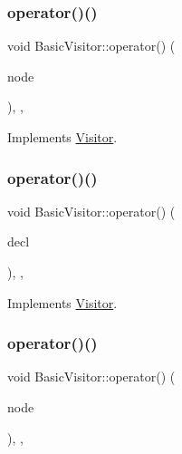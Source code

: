 \subsubsection{\texorpdfstring{operator()()}{operator()()}\hspace{0.1cm}{\footnotesize\ttfamily [43/60]}}
{\footnotesize\ttfamily void Basic\+Visitor\+::operator() (\begin{DoxyParamCaption}\item[{const \hyperlink{struct_default_clause}{Default\+Clause} \&}]{node }\end{DoxyParamCaption})\hspace{0.3cm}{\ttfamily [inline]}, {\ttfamily [override]}, {\ttfamily [virtual]}}



Implements \hyperlink{struct_visitor_adf82a6bdb4aad978d8ac6a3878a0d400}{Visitor}.

\mbox{\label{struct_basic_visitor_a2871985a62b51f8f5212a5a65e47b7b8}} 
\subsubsection{\texorpdfstring{operator()()}{operator()()}\hspace{0.1cm}{\footnotesize\ttfamily [44/60]}}
{\footnotesize\ttfamily void Basic\+Visitor\+::operator() (\begin{DoxyParamCaption}\item[{const \hyperlink{struct_function_declaration}{Function\+Declaration} \&}]{decl }\end{DoxyParamCaption})\hspace{0.3cm}{\ttfamily [inline]}, {\ttfamily [override]}, {\ttfamily [virtual]}}



Implements \hyperlink{struct_visitor_aa4450ebee6fecf69499279c0768282f1}{Visitor}.

\mbox{\label{struct_basic_visitor_ac9435a48d44ce32bd726cbf46bcc9032}} 
\subsubsection{\texorpdfstring{operator()()}{operator()()}\hspace{0.1cm}{\footnotesize\ttfamily [45/60]}}
{\footnotesize\ttfamily void Basic\+Visitor\+::operator() (\begin{DoxyParamCaption}\item[{const \hyperlink{struct_function_body}{Function\+Body} \&}]{node }\end{DoxyParamCaption})\hspace{0.3cm}{\ttfamily [inline]}, {\ttfamily [override]}, {\ttfamily [virtual]}}



